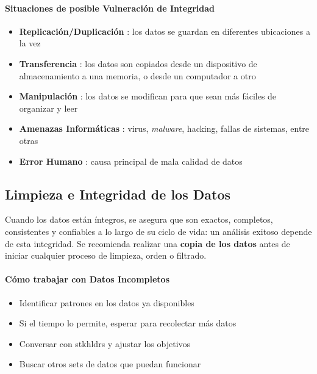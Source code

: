 \paragraph{Situaciones de posible Vulneración de Integridad}
\begin{itemize}
    \item {\textbf{Replicación/Duplicación} : los datos se guardan en diferentes ubicaciones a la vez}
    \item {\textbf{Transferencia} : los datos son copiados desde un dispositivo de almacenamiento a una memoria, o desde un computador a otro}
    \item {\textbf{Manipulación} : los datos se modifican para que sean más fáciles de organizar y leer} 
    \item {\textbf{Amenazas Informáticas} : virus, \textit{malware}, hacking, fallas de sistemas, entre otras}
    \item {\textbf{Error Humano} : causa principal de mala calidad de datos}
\end{itemize}

\subsection{Limpieza e Integridad de los Datos}
Cuando los datos están íntegros, se asegura que son exactos, completos, consistentes y confiables a lo largo de su ciclo de vida: un análisis exitoso depende de esta integridad. Se recomienda realizar una \textbf{copia de los datos} antes de iniciar cualquier proceso de limpieza, orden o filtrado. 
\paragraph{Cómo trabajar con Datos Incompletos}
\begin{itemize}
    \item {Identificar patrones en los datos ya disponibles}
    \item {Si el tiempo lo permite, esperar para recolectar más datos}
    \item {Conversar con \gls{stkhldrs} y ajustar los objetivos}
    \item {Buscar otros sets de datos que puedan funcionar}
\end{itemize}


